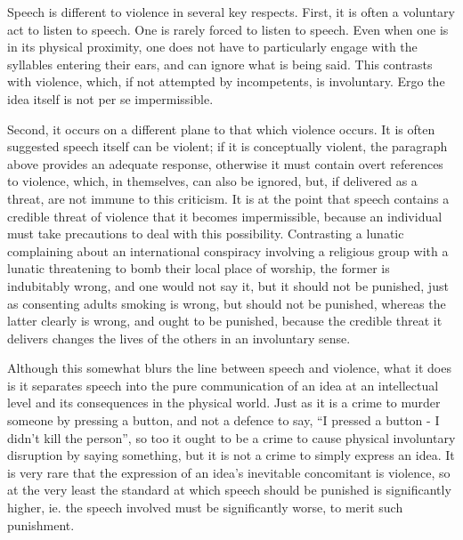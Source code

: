 Speech is different to violence in several key respects. First, it is
often a voluntary act to listen to speech. One is rarely forced to
listen to speech. Even when one is in its physical proximity, one does
not have to particularly engage with the syllables entering their ears,
and can ignore what is being said. This contrasts with violence, which,
if not attempted by incompetents, is involuntary. Ergo the idea itself
is not per se impermissible.

Second, it occurs on a different plane to that which violence occurs. It
is often suggested speech itself can be violent; if it is conceptually
violent, the paragraph above provides an adequate response, otherwise it
must contain overt references to violence, which, in themselves, can
also be ignored, but, if delivered as a threat, are not immune to this
criticism. It is at the point that speech contains a credible threat of
violence that it becomes impermissible, because an individual must take
precautions to deal with this possibility. Contrasting a lunatic
complaining about an international conspiracy involving a religious
group with a lunatic threatening to bomb their local place of worship,
the former is indubitably wrong, and one would not say it, but it should
not be punished, just as consenting adults smoking is wrong, but should
not be punished, whereas the latter clearly is wrong, and ought to be
punished, because the credible threat it delivers changes the lives of
the others in an involuntary sense.

Although this somewhat blurs the line between speech and violence, what
it does is it separates speech into the pure communication of an idea at
an intellectual level and its consequences in the physical world. Just
as it is a crime to murder someone by pressing a button, and not a
defence to say, ``I pressed a button - I didn't kill the person'', so
too it ought to be a crime to cause physical involuntary disruption by
saying something, but it is not a crime to simply express an idea. It is
very rare that the expression of an idea's inevitable concomitant is
violence, so at the very least the standard at which speech should be
punished is significantly higher, ie. the speech involved must be
significantly worse, to merit such punishment.

